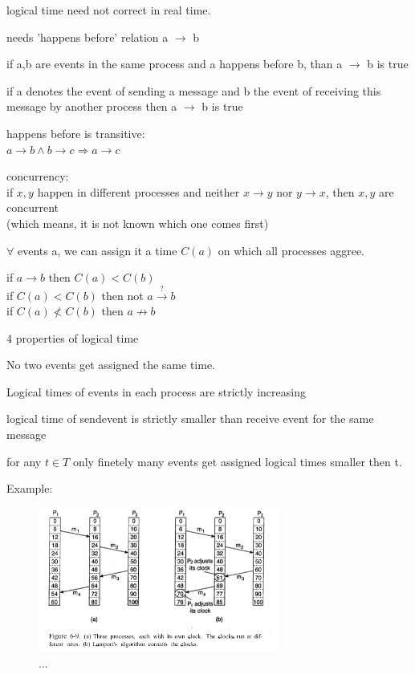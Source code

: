\documentclass[ngerman,a4paper]{report}
\begin{document}
\begin{compactitem}
\item logical time need not correct in real time.
\item needs 'happens before' relation a $\rightarrow$ b

\begin{compactenum}
\item if a,b are events in the same process and a happens before b, than a $\rightarrow$ b is true
\item if a denotes the event of sending a message and b the event of receiving this message by another process then a $\rightarrow$ b is true 
\end{compactenum}

\item happens before is transitive:\\
$a \rightarrow b \land b \rightarrow c \Rightarrow a \rightarrow c$
\item concurrency:\\
if $x, y$ happen in different processes and neither $x \rightarrow y$ nor $y \rightarrow x$, then $x, y$ are concurrent\\
(which means, it is not known which one comes first)
\item $\forall$ events a, we can assign it a time $C(a)$ on which all processes aggree.
\item if $a \rightarrow b$ then $C(a) < C(b)$ \\
    if $C(a) < C(b)$ then not $a \xrightarrow{?} b$\\
    if $C(a) \not < C(b)$ then $ a \not \rightarrow b$\\

\item 4 properties of logical time
\begin{compactenum}
\item No two events get assigned the same time.
\item Logical times of events in each process are strictly increasing
\item logical time of sendevent is strictly smaller than receive event for the same message
\item for any $t \in T$ only finetely many events get assigned logical times smaller then  t.
\end{compactenum}
\item Example:

\begin{figure}[h]
	\centering
	\includegraphics[width=300px]{gfx/lamport.png}
	\caption{...}
	\label{img:lamport}
\end{figure}

\end{compactitem}
\end{document}
